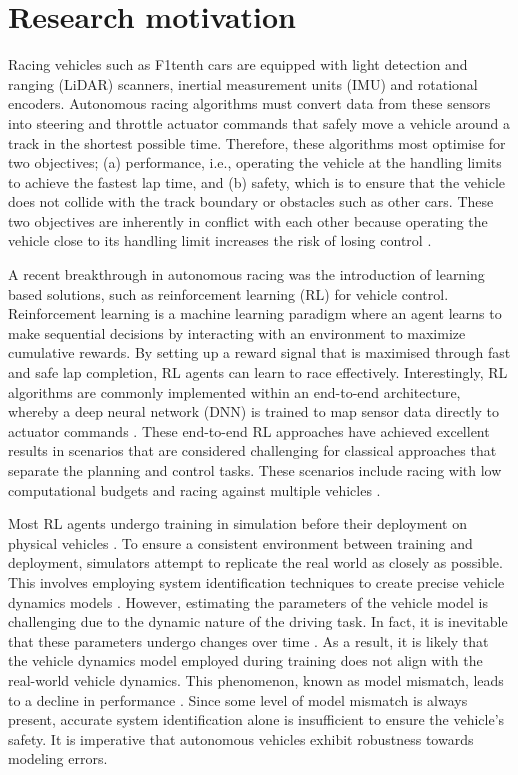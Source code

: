 \section{Research motivation}

Racing vehicles such as F1tenth cars are equipped with light detection and ranging (LiDAR) scanners, inertial measurement units (IMU) and rotational encoders.
Autonomous racing algorithms must convert data from these sensors into steering and throttle actuator commands  that safely move a vehicle around a track in the shortest possible time.
Therefore, these algorithms most optimise for two objectives;
(a) performance, i.e., operating the vehicle at the handling limits to achieve the fastest lap time, and (b) safety, which is to ensure that the vehicle does not collide with the track boundary or obstacles such as other cars.
These two objectives are inherently in conflict with each other because operating the vehicle close to its handling limit increases the risk of losing control \cite{Betz2021}.

A recent breakthrough in autonomous racing was the introduction of learning based solutions, such as reinforcement learning (RL) for vehicle control.
Reinforcement learning is a machine learning paradigm where an agent learns to make sequential decisions by interacting with an environment to maximize cumulative rewards.
By setting up a reward signal that is maximised through fast and safe lap completion, RL agents can learn to race effectively.
Interestingly, RL algorithms are commonly implemented within an end-to-end architecture, whereby a deep neural network (DNN) is trained to map sensor data directly to actuator commands \cite{Betz2021}.
These end-to-end RL approaches have achieved excellent results in scenarios that are considered challenging for classical approaches that separate the planning and control tasks.
These scenarios include racing with low computational budgets \cite{Evans2021a, Tatulea-Codrean2020} and racing against multiple vehicles \cite{Song2021, Wurman2022}.

Most RL agents undergo training in simulation before their deployment on physical vehicles \cite{Babu2020, Zhou2020}.
To ensure a consistent environment between training and deployment, simulators attempt to replicate the real world as closely as possible.
This involves employing system identification techniques to create precise vehicle dynamics models \cite{Zhou2020}.
However, estimating the parameters of the vehicle model is challenging due to the dynamic nature of the driving task. 
In fact, it is inevitable that these parameters undergo changes over time \cite{Zhao2017}.
As a result, it is likely that the vehicle dynamics model employed during training does not align with the real-world vehicle dynamics. 
This phenomenon, known as model mismatch, leads to a decline in performance \cite{Ghignone2022}. 
Since some level of model mismatch is always present, accurate system identification alone is insufficient to ensure the vehicle's safety. 
It is imperative that autonomous vehicles exhibit robustness towards modeling errors.

